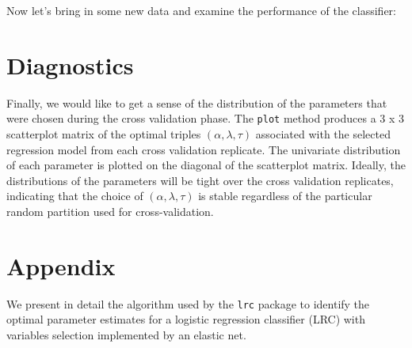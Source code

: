 \documentclass{article}
\begin{document}
\noindent Now let's bring in some new data and examine the performance of the classifier:
% 
% 
% 
% 

\section{Diagnostics}

\noindent Finally, we would like to get a sense of the distribution of the parameters that were chosen 
during the cross validation phase. The {\tt plot} method produces a 3 x 3 scatterplot matrix of the optimal 
triples $\left(\alpha, \lambda, \tau\right)$ associated with the selected regression model from each cross 
validation replicate. The univariate distribution of each parameter is plotted on the diagonal of the 
scatterplot matrix.  Ideally, the distributions of the parameters will be tight over the cross validation 
replicates, indicating that the choice of $\left(\alpha, \lambda, \tau\right)$ is stable regardless of
the particular random partition used for cross-validation.


\nocite{*}

  

\newpage

\section*{Appendix}
We present in detail the algorithm used by the {\tt lrc} package to identify the optimal parameter estimates
for a logistic regression classifier (LRC) with variables selection implemented by an elastic net.  
\end{document}
